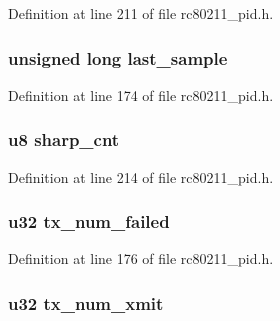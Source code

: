 Definition at line 211 of file rc80211\-\_\-pid.\-h.

\hypertarget{structrc__pid__sta__info_ad13df28eb9ff39a645e7957d166e5fbd}{
\subsubsection[{last\-\_\-sample}]{\setlength{\rightskip}{0pt plus 5cm}unsigned long last\-\_\-sample}}\label{structrc__pid__sta__info_ad13df28eb9ff39a645e7957d166e5fbd}


Definition at line 174 of file rc80211\-\_\-pid.\-h.

\hypertarget{structrc__pid__sta__info_a20b3ceb286dda8e93db425fc68bd1a42}{
\subsubsection[{sharp\-\_\-cnt}]{\setlength{\rightskip}{0pt plus 5cm}u8 sharp\-\_\-cnt}}\label{structrc__pid__sta__info_a20b3ceb286dda8e93db425fc68bd1a42}


Definition at line 214 of file rc80211\-\_\-pid.\-h.

\hypertarget{structrc__pid__sta__info_a607670e1156f0a101a7e910cf70709bb}{
\subsubsection[{tx\-\_\-num\-\_\-failed}]{\setlength{\rightskip}{0pt plus 5cm}u32 tx\-\_\-num\-\_\-failed}}\label{structrc__pid__sta__info_a607670e1156f0a101a7e910cf70709bb}


Definition at line 176 of file rc80211\-\_\-pid.\-h.

\hypertarget{structrc__pid__sta__info_ada3db223fd162145ee8c39252fe1d095}{
\subsubsection[{tx\-\_\-num\-\_\-xmit}]{\setlength{\rightskip}{0pt plus 5cm}u32 tx\-\_\-num\-\_\-xmit}}\label{structrc__pid__sta__info_ada3db223fd162145ee8c39252fe1d095}


